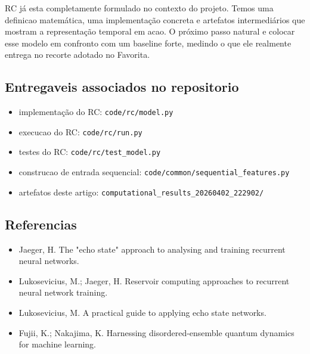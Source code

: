 \documentclass[12pt]{article}
\providecommand{\tightlist}{%
          \setlength{\itemsep}{0pt}\setlength{\parskip}{0pt}}
\begin{document}
RC já esta completamente formulado no contexto do projeto. Temos uma definicao matemática, uma implementação concreta e artefatos intermediários que mostram a representação temporal em acao. O próximo passo natural e colocar esse modelo em confronto com um baseline forte, medindo o que ele realmente entrega no recorte adotado no Favorita.

\subsection{Entregaveis associados no repositorio}\label{entregaveis-associados-no-repositorio}

\begin{itemize}
\tightlist
\item
  implementação do RC: \texttt{code/rc/model.py}
\item
  execucao do RC: \texttt{code/rc/run.py}
\item
  testes do RC: \texttt{code/rc/test\_model.py}
\item
  construcao de entrada sequencial: \texttt{code/common/sequential\_features.py}
\item
  artefatos deste artigo: \texttt{computational\_results\_20260402\_222902/}
\end{itemize}

\subsection{Referencias}\label{referencias}

\begin{itemize}
\tightlist
\item
  Jaeger, H. The "echo state" approach to analysing and training recurrent neural networks.
\item
  Lukosevicius, M.; Jaeger, H. Reservoir computing approaches to recurrent neural network training.
\item
  Lukosevicius, M. A practical guide to applying echo state networks.
\item
  Fujii, K.; Nakajima, K. Harnessing disordered-ensemble quantum dynamics for machine learning.
\end{itemize}

        
\end{document}
